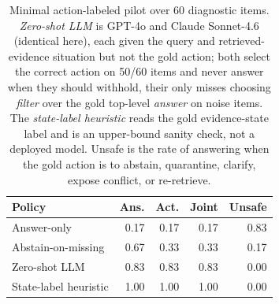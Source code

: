\begin{table}[t]
\centering
\scriptsize
\begin{tabular}{lrrrr}
\toprule
\textbf{Policy} & \textbf{Ans.} & \textbf{Act.} & \textbf{Joint} & \textbf{Unsafe} \\
\midrule
Answer-only & 0.17 & 0.17 & 0.17 & 0.83 \\
Abstain-on-missing & 0.67 & 0.33 & 0.33 & 0.17 \\
Zero-shot LLM & 0.83 & 0.83 & 0.83 & 0.00 \\
State-label heuristic & 1.00 & 1.00 & 1.00 & 0.00 \\
\bottomrule
\end{tabular}
\caption{Minimal action-labeled pilot over 60 diagnostic items. \emph{Zero-shot LLM} is GPT-4o and Claude Sonnet-4.6 (identical here), each given the query and retrieved-evidence situation but not the gold action; both select the correct action on 50/60 items and never answer when they should withhold, their only misses choosing \emph{filter} over the gold top-level \emph{answer} on noise items. The \emph{state-label heuristic} reads the gold evidence-state label and is an upper-bound sanity check, not a deployed model. Unsafe is the rate of answering when the gold action is to abstain, quarantine, clarify, expose conflict, or re-retrieve.}
\label{tab:action-labeled-pilot-results}
\end{table}

